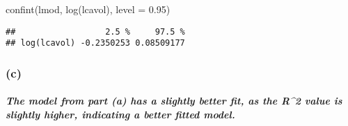 \documentclass[
]{article}
\newenvironment{Shaded}{\begin{snugshade}}{\end{snugshade}}
\newcommand{\AttributeTok}[1]{\textcolor[rgb]{0.77,0.63,0.00}{#1}}
\newcommand{\FloatTok}[1]{\textcolor[rgb]{0.00,0.00,0.81}{#1}}
\newcommand{\FunctionTok}[1]{\textcolor[rgb]{0.00,0.00,0.00}{#1}}
\newcommand{\NormalTok}[1]{#1}
\newcommand{\StringTok}[1]{\textcolor[rgb]{0.31,0.60,0.02}{#1}}
\begin{document}
\begin{Shaded}
\begin{Highlighting}[]
\FunctionTok{confint}\NormalTok{(lmod, }\StringTok{\textquotesingle{}log(lcavol)\textquotesingle{}}\NormalTok{, }\AttributeTok{level =} \FloatTok{0.95}\NormalTok{)}
\end{Highlighting}
\end{Shaded}

\begin{verbatim}
##                  2.5 %     97.5 %
## log(lcavol) -0.2350253 0.08509177
\end{verbatim}

\hypertarget{c-3}{%
\subsubsection{(c)}\label{c-3}}

\hypertarget{the-model-from-part-a-has-a-slightly-better-fit-as-the-r2-value-is-slightly-higher-indicating-a-better-fitted-model.}{%
\subparagraph{The model from part (a) has a slightly better fit, as the
R\^{}2 value is slightly higher, indicating a better fitted
model.}\label{the-model-from-part-a-has-a-slightly-better-fit-as-the-r2-value-is-slightly-higher-indicating-a-better-fitted-model.}}
\end{document}
